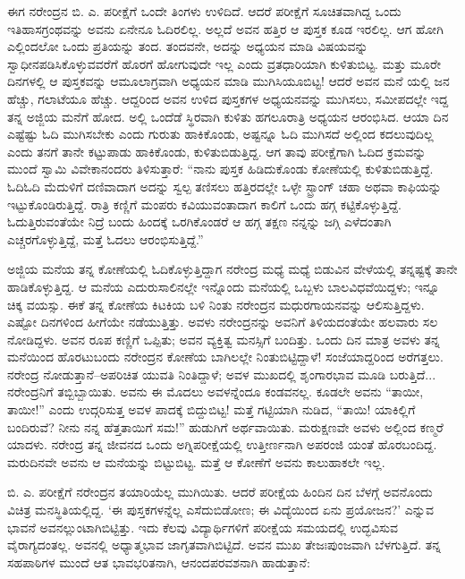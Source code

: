ಈಗ ನರೇಂದ್ರನ ಬಿ. ಎ. ಪರೀಕ್ಷೆಗೆ ಒಂದೇ ತಿಂಗಳು ಉಳಿದಿದೆ. ಆದರೆ ಪರೀಕ್ಷೆಗೆ ಸೂಚಿತವಾಗಿದ್ದ ಒಂದು ಇತಿಹಾಸಗ್ರಂಥವನ್ನು ಅವನು ಏನೇನೂ ಓದಿರಲಿಲ್ಲ. ಅಲ್ಲದೆ ಅವನ ಹತ್ತಿರ ಆ ಪುಸ್ತಕ ಕೂಡ ಇರಲಿಲ್ಲ. ಆಗ ಹೋಗಿ ಎಲ್ಲಿಂದಲೋ ಒಂದು ಪ್ರತಿಯನ್ನು ತಂದ. ತಂದವನೇ, ಅದನ್ನು ಅಧ್ಯಯನ ಮಾಡಿ ವಿಷಯವನ್ನು ಸ್ವಾಧೀನಪಡಿಸಿಕೊಳ್ಳುವವರೆಗೆ ಹೊರಗೆ ಹೋಗುವುದೇ ಇಲ್ಲ ಎಂದು ವ್ರತಧಾರಿಯಾಗಿ ಕುಳಿತುಬಿಟ್ಟ. ಮತ್ತು ಮೂರೇ ದಿನಗಳಲ್ಲಿ ಆ ಪುಸ್ತಕವನ್ನು ಆಮೂಲಾಗ್ರವಾಗಿ ಅಧ್ಯಯನ ಮಾಡಿ ಮುಗಿಸಿಯೂಬಿಟ್ಟ! ಆದರೆ ಅವನ ಮನೆ ಯಲ್ಲಿ ಜನ ಹೆಚ್ಚು, ಗಲಾಟೆಯೂ ಹೆಚ್ಚು. ಆದ್ದರಿಂದ ಅವನ ಉಳಿದ ಪುಸ್ತಕಗಳ ಅಧ್ಯಯನವನ್ನು ಮುಗಿಸಲು, ಸಮೀಪದಲ್ಲೇ ಇದ್ದ ತನ್ನ ಅಜ್ಜಿಯ ಮನೆಗೆ ಹೋದ. ಅಲ್ಲಿ ಒಂದೆಡೆ ಸ್ಥಿರವಾಗಿ ಕುಳಿತು ಹಗಲೂರಾತ್ರಿ ಅಧ್ಯಯನ ಆರಂಭಿಸಿದ. ಆಯಾ ದಿನ ಎಷ್ಟೆಷ್ಟು ಓದಿ ಮುಗಿಸಬೇಕು ಎಂದು ಗುರುತು ಹಾಕಿಕೊಂಡು, ಅಷ್ಟನ್ನೂ ಓದಿ ಮುಗಿಸದೆ ಅಲ್ಲಿಂದ ಕದಲುವುದಿಲ್ಲ ಎಂದು ತನಗೆ ತಾನೇ ಕಟ್ಟುಪಾಡು ಹಾಕಿಕೊಂಡು, ಕುಳಿತುಬಿಡುತ್ತಿದ್ದ. ಆಗ ತಾವು ಪರೀಕ್ಷೆಗಾಗಿ ಓದಿದ ಕ್ರಮವನ್ನು ಮುಂದೆ ಸ್ವಾಮಿ ವಿವೇಕಾನಂದರು ತಿಳಿಸುತ್ತಾರೆ: “ನಾನು ಪುಸ್ತಕ ಹಿಡಿದುಕೊಂಡು ಕೋಣೆಯಲ್ಲಿ ಕುಳಿತುಬಿಡುತ್ತಿದ್ದೆ. ಓದಿಓದಿ ಮೆದುಳಿಗೆ ದಣಿವಾದಾಗ ಅದನ್ನು ಸ್ವಲ್ಪ ತಣಿಸಲು ಹತ್ತಿರದಲ್ಲೇ ಒಳ್ಳೇ ಸ್ಟ್ರಾಂಗ್ ಚಹಾ ಅಥವಾ ಕಾಫಿಯನ್ನು ಇಟ್ಟುಕೊಂಡಿರುತ್ತಿದ್ದೆ. ರಾತ್ರಿ ಕಣ್ಣಿಗೆ ಮಂಪರು ಕವಿಯುವಂತಾದಾಗ ಕಾಲಿಗೆ ಒಂದು ಹಗ್ಗ ಕಟ್ಟಿಕೊಳ್ಳುತ್ತಿದ್ದೆ. ಓದುತ್ತಿರುವಂತೆಯೇ ನಿದ್ರೆ ಬಂದು ಹಿಂದಕ್ಕೆ ಒರಗಿಕೊಂಡರೆ ಆ ಹಗ್ಗ ತಕ್ಷಣ ನನ್ನನ್ನು ಜಗ್ಗಿ ಎಳೆದಂತಾಗಿ ಎಚ್ಚರಗೊಳ್ಳುತ್ತಿದ್ದೆ, ಮತ್ತೆ ಓದಲು ಆರಂಭಿಸುತ್ತಿದ್ದೆ.”

ಅಜ್ಜಿಯ ಮನೆಯ ತನ್ನ ಕೋಣೆಯಲ್ಲಿ ಓದಿಕೊಳ್ಳುತ್ತಿದ್ದಾಗ ನರೇಂದ್ರ ಮಧ್ಯೆ ಮಧ್ಯೆ ಬಿಡುವಿನ ವೇಳೆಯಲ್ಲಿ ತನ್ನಷ್ಟಕ್ಕೆ ತಾನೇ ಹಾಡಿಕೊಳ್ಳುತ್ತಿದ್ದ. ಆ ಮನೆಯ ಎದುರುಸಾಲಿನಲ್ಲೇ ಇನ್ನೊಂದು ಮನೆಯಲ್ಲಿ ಒಬ್ಬಳು ಬಾಲವಿಧವೆಯಿದ್ದಳು; ಇನ್ನೂ ಚಿಕ್ಕ ವಯಸ್ಸು. ಈಕೆ ತನ್ನ ಕೋಣೆಯ ಕಿಟಕಿಯ ಬಳಿ ನಿಂತು ನರೇಂದ್ರನ ಮಧುರಗಾಯನವನ್ನು ಆಲಿಸುತ್ತಿದ್ದಳು. ಎಷ್ಟೋ ದಿನಗಳಿಂದ ಹೀಗೆಯೇ ನಡೆಯುತ್ತಿತ್ತು. ಅವಳು ನರೇಂದ್ರನನ್ನು ಅವನಿಗೆ ತಿಳಿಯದಂತೆಯೇ ಹಲವಾರು ಸಲ ನೋಡಿದ್ದಳು. ಅವನ ರೂಪ ಕಣ್ಣಿಗೆ ಒಪ್ಪಿತು; ಅವನ ವ್ಯಕ್ತಿತ್ವ ಮನಸ್ಸಿಗೆ ಬಂದಿತ್ತು. ಒಂದು ದಿನ ಮಾತ್ರ ಅವಳು ತನ್ನ ಮನೆಯಿಂದ ಹೊರಟುಬಂದು ನರೇಂದ್ರನ ಕೋಣೆಯ ಬಾಗಿಲಲ್ಲೇ ನಿಂತುಬಿಟ್ಟಿದ್ದಾಳೆ! ಸಂಜೆಯಾದ್ದರಿಂದ ಅರೆಗತ್ತಲು. ನರೇಂದ್ರ ನೋಡುತ್ತಾನೆ–ಅಪರಿಚಿತ ಯುವತಿ ನಿಂತಿದ್ದಾಳೆ; ಅವಳ ಮುಖದಲ್ಲಿ ಶೃಂಗಾರಭಾವ ಮೂಡಿ ಬರುತ್ತಿದೆ... ನರೇಂದ್ರನಿಗೆ ತಬ್ಬಿಬ್ಬಾಯಿತು. ಅವನು ಈ ಮೊದಲು ಅವಳನ್ನೆಂದೂ ಕಂಡವನಲ್ಲ. ಕೂಡಲೇ ಅವನು “ತಾಯೀ, ತಾಯೀ!” ಎಂದು ಉದ್ಗರಿಸುತ್ತ ಅವಳ ಪಾದಕ್ಕೆ ಬಿದ್ದುಬಿಟ್ಟ! ಮತ್ತೆ ಗಟ್ಟಿಯಾಗಿ ನುಡಿದ, “ತಾಯಿ! ಯಾಕಿಲ್ಲಿಗೆ ಬಂದಿರುವೆ? ನೀನು ನನ್ನ ಹೆತ್ತತಾಯಿಗೆ ಸಮ!” ಹುಡುಗಿಗೆ ಅರ್ಥವಾಯಿತು. ಮರುಕ್ಷಣವೇ ಅವಳು ಅಲ್ಲಿಂದ ಕಣ್ಮರೆ ಯಾದಳು. ನರೇಂದ್ರ ತನ್ನ ಜೀವನದ ಒಂದು ಅಗ್ನಿಪರೀಕ್ಷೆಯಲ್ಲಿ ಉತ್ತೀರ್ಣನಾಗಿ ಅಪರಂಜಿ ಯಂತೆ ಹೊರಬಂದಿದ್ದ. ಮರುದಿನವೇ ಅವನು ಆ ಮನೆಯನ್ನು ಬಿಟ್ಟುಬಿಟ್ಟ. ಮತ್ತೆ ಆ ಕೋಣೆಗೆ ಅವನು ಕಾಲುಹಾಕಲೇ ಇಲ್ಲ.

ಬಿ. ಎ. ಪರೀಕ್ಷೆಗೆ ನರೇಂದ್ರನ ತಯಾರಿಯೆಲ್ಲ ಮುಗಿಯಿತು. ಆದರೆ ಪರೀಕ್ಷೆಯ ಹಿಂದಿನ ದಿನ ಬೆಳಗ್ಗೆ ಅವನೊಂದು ವಿಚಿತ್ರ ಮನಸ್ಥಿತಿಯಲ್ಲಿದ್ದ. ‘ಈ ಪುಸ್ತಕಗಳನ್ನೆಲ್ಲ ಎಸೆದುಬಿಡೋಣ; ಈ ವಿದ್ಯೆಯಿಂದ ಏನು ಪ್ರಯೋಜನ?’ ಎನ್ನುವ ಭಾವನೆ ಅವನಲ್ಲುಂಟಾಗಿಬಿಟ್ಟಿತ್ತು. ಇದು ಕೆಲವು ವಿದ್ಯಾರ್ಥಿಗಳಿಗೆ ಪರೀಕ್ಷೆಯ ಸಮಯದಲ್ಲಿ ಉದ್ಭವಿಸುವ ವೈರಾಗ್ಯದಂತಲ್ಲ. ಅವನಲ್ಲಿ ಅಧ್ಯಾತ್ಮಭಾವ ಜಾಗೃತವಾಗಿಬಿಟ್ಟಿದೆ. ಅವನ ಮುಖ ತೇಜಃಪುಂಜವಾಗಿ ಬೆಳಗುತ್ತಿದೆ. ತನ್ನ ಸಹಪಾಠಿಗಳ ಮುಂದೆ ಆತ ಭಾವಭರಿತನಾಗಿ, ಆನಂದಪರವಶನಾಗಿ ಹಾಡುತ್ತಾನೆ:

